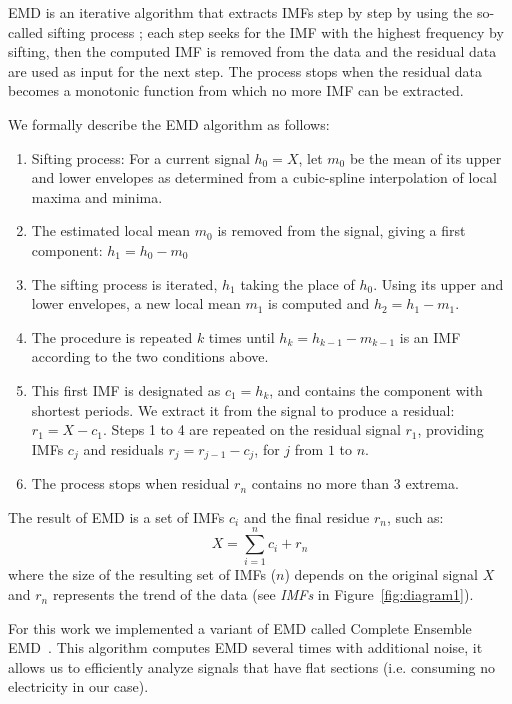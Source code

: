 EMD is an iterative algorithm that extracts IMFs step by step by using the so-called sifting process \cite{huang:emd1998}; each step seeks for the IMF with the highest frequency by sifting, then the computed IMF is removed from the data and the residual data are used as input for the 
next step.
The process stops when the residual data becomes a monotonic function from which no more IMF can be extracted.

We formally describe the EMD algorithm as follows: 
\begin{enumerate}
\item Sifting process: For a current signal $h_0=X$, let $m_0$ be the mean of its upper and lower envelopes as determined from a cubic-spline interpolation of local maxima and minima.
\item The estimated local mean $m_0$ is removed from the signal, giving a first component: $h_1 = h_0-m_0$
\item The sifting process is iterated, $h_1$ taking the place of $h_0$. Using its upper and lower envelopes, a new local mean $m_1$ is computed and $h_2 = h_1-m_1$.
\item The procedure is repeated $k$ times until $h_k=h_{k-1}-m_{k-1}$ is an IMF according to the two conditions above.
\item This first IMF is designated as $c_1 = h_k$, and contains the component with shortest periods. We extract it from the signal to produce a residual: $r_1 = X - c_1$.  Steps 1 to 4 are repeated on the residual signal $r_1$, providing IMFs $c_j$ and residuals $r_j  = r_{j-1}-c_j$, for $j$ from $1$ to $n$.
\item The process stops when residual $r_n$ contains no more than 3 extrema.
\end{enumerate}

The result of EMD is a set of IMFs $c_i$ and the final residue $r_n$, such as: \[X=\sum^{n}_{i=1}c_i+r_n\]
where the size of the resulting set of IMFs ($n$) depends on the original signal $X$ and $r_n$ represents the trend of 
the data (see \emph{IMFs} in Figure~\ref{fig:diagram1}).

For this work we implemented a variant of EMD called Complete Ensemble EMD~\cite{torres:icassp2012}.
This algorithm computes EMD several times with additional noise, it allows us to efficiently analyze signals that have 
flat sections (i.e. consuming no electricity in our case). %

